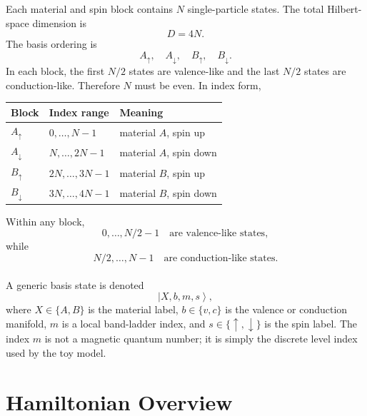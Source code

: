 \documentclass[11pt,a4paper]{article}
\newcommand{\ket}[1]{\left|#1\right\rangle}
\begin{document}
Each material and spin block contains $N$ single-particle states.  
The total Hilbert-space dimension is
\begin{equation}
D = 4N.
\end{equation}
The basis ordering is
\begin{equation}
A_\uparrow,
\quad
A_\downarrow,
\quad
B_\uparrow,
\quad
B_\downarrow.
\end{equation}
In each block, the first $N/2$ states are valence-like and 
the last $N/2$ states are conduction-like.  Therefore $N$ must be even.  In index form,
\begin{center}
\begin{tabular}{lll}
\toprule
Block & Index range & Meaning \\
\midrule
$A_\uparrow$ & $0,\ldots,N-1$ & material $A$, spin up \\
$A_\downarrow$ & $N,\ldots,2N-1$ & material $A$, spin down \\
$B_\uparrow$ & $2N,\ldots,3N-1$ & material $B$, spin up \\
$B_\downarrow$ & $3N,\ldots,4N-1$ & material $B$, spin down \\
\bottomrule
\end{tabular}
\end{center}
Within any block,
\begin{equation}
0,\ldots,N/2-1 \quad \text{are valence-like states},
\end{equation}
while
\begin{equation}
N/2,\ldots,N-1 \quad \text{are conduction-like states}.
\end{equation}
\\
A generic basis state is denoted
\begin{equation}
\ket{X,b,m,s},
\end{equation}
where \(X\in\{A,B\}\) is the material label, 
\(b\in\{v,c\}\) is the valence or conduction manifold, 
\(m\) is a local band-ladder index, and \(s\in\{\uparrow,\downarrow\}\) is the spin label.  
The index \(m\) is not a magnetic quantum number; it is simply the discrete level index used 
by the toy model.

\section{Hamiltonian Overview}
\end{document}
